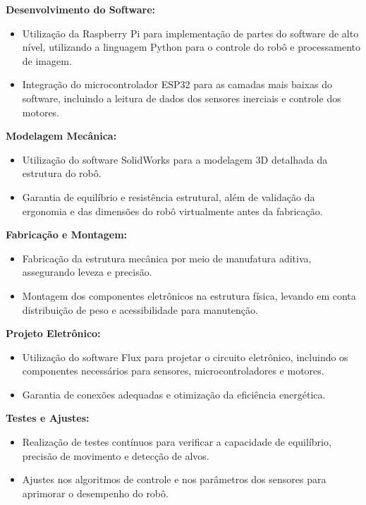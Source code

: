 \textbf{Desenvolvimento do Software:}
\begin{itemize}
   \item Utilização da Raspberry Pi para implementação de partes do software de alto nível, utilizando a linguagem Python para o controle do robô e processamento de imagem.
   \item Integração do microcontrolador ESP32 para as camadas mais baixas do software, incluindo a leitura de dados dos sensores inerciais e controle dos motores.
\end{itemize}

\textbf{Modelagem Mecânica:}
\begin{itemize}
   \item Utilização do software SolidWorks para a modelagem 3D detalhada da estrutura do robô.
   \item Garantia de equilíbrio e resistência estrutural, além de validação da ergonomia e das dimensões do robô virtualmente antes da fabricação.
\end{itemize}

\textbf{Fabricação e Montagem:}
\begin{itemize}
   \item Fabricação da estrutura mecânica por meio de manufatura aditiva, assegurando leveza e precisão.
   \item Montagem dos componentes eletrônicos na estrutura física, levando em conta distribuição de peso e acessibilidade para manutenção.
\end{itemize}

\textbf{Projeto Eletrônico:}
\begin{itemize}
   \item Utilização do software Flux para projetar o circuito eletrônico, incluindo os componentes necessários para sensores, microcontroladores e motores.
   \item Garantia de conexões adequadas e otimização da eficiência energética.
\end{itemize}

\textbf{Testes e Ajustes:}
\begin{itemize}
   \item Realização de testes contínuos para verificar a capacidade de equilíbrio, precisão de movimento e detecção de alvos.
   \item Ajustes nos algoritmos de controle e nos parâmetros dos sensores para aprimorar o desempenho do robô.
\end{itemize}


